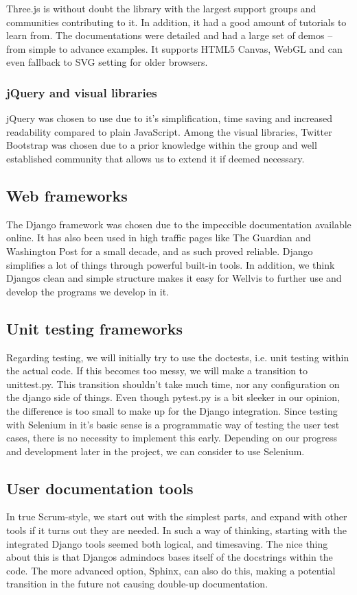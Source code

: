 \documentclass{report}
\begin{document}
Three.js is without doubt the library with the largest support groups and communities contributing to it. In addition, it had a good amount of tutorials to learn from. The documentations were detailed and had a large set of demos – from simple to advance examples. It supports HTML5 Canvas, WebGL and can even fallback to SVG setting for older browsers.
\subsubsection{jQuery and visual libraries}
jQuery was chosen to use due to it's simplification, time saving and increased readability compared to plain JavaScript. Among the visual libraries, Twitter Bootstrap was chosen due to a prior knowledge within the group and well established community that allows us to extend it if deemed necessary.
\subsection{Web frameworks}
The Django framework was chosen due to the impeccible documentation available online. It has also been used in high traffic pages like The Guardian and Washington Post for a small decade\cite{webpage:django_washingtonpost}, and as such proved reliable. Django simplifies a lot of things through powerful built-in tools. In addition, we think Djangos clean and simple structure makes it easy for Wellvis to further use and develop the programs we develop in it.
\subsection{Unit testing frameworks}
Regarding testing, we will initially try to use the doctests, i.e. unit testing within the actual code. If this becomes too messy, we will make a transition to unittest.py. This transition shouldn’t take much time, nor any configuration on the django side of things. Even though pytest.py is a bit sleeker in our opinion, the difference is too small to make up for the Django integration. Since testing with Selenium in it’s basic sense is a programmatic way of testing the user test cases, there is no necessity to implement this early. Depending on our progress and development later in the project, we can consider to use Selenium.
\subsection{User documentation tools}
In true Scrum-style, we start out with the simplest parts, and expand with other tools if it turns out they are needed. In such a way of thinking, starting with the integrated Django tools seemed both logical, and timesaving. The nice thing about this is that Djangos admindocs bases itself of the docstrings within the code. The more advanced option, Sphinx, can also do this, making a potential transition in the future not causing double-up documentation.
\end{document}

